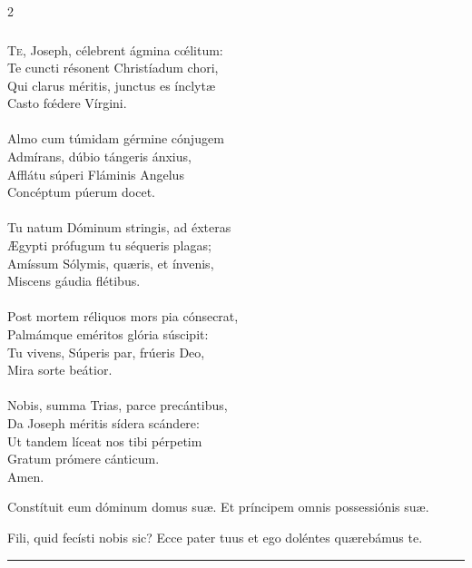 \documentclass[9pt,twoside]{extarticle}
\begin{document}
\begin{multicols}{2}
\subsubsection*{\center {}}
\lettrine{T}e, Joseph, célebrent ágmina cœ́litum:\\
Te cuncti résonent Christíadum chori,\\
Qui clarus méritis, junctus es ínclytæ\\
Casto fœ́dere Vírgini.\\
\\
Almo cum túmidam gérmine cónjugem\\
Admírans, dúbio tángeris ánxius,\\
Afflátu súperi Fláminis Angelus\\
Concéptum púerum docet.\\
\\
Tu natum Dóminum stringis, ad éxteras\\
Ægypti prófugum tu séqueris plagas;\\
Amíssum Sólymis, quæris, et ínvenis,\\
Miscens gáudia flétibus.\\
\\
Post mortem réliquos mors pia cónsecrat,\\
Palmámque eméritos glória súscipit:\\
Tu vivens, Súperis par, frúeris Deo,\\
Mira sorte beátior.\\
\\
Nobis, summa Trias, parce precántibus,\\
Da Joseph méritis sídera scándere:\\
Ut tandem líceat nos tibi pérpetim\\
Gratum prómere cánticum.\\
Amen.

\begin{tightlist}{}
\item {} Constítuit eum dóminum domus suæ.  Et príncipem omnis possessiónis suæ.
\item {} Fili, quid fecísti nobis sic? Ecce pater tuus et ego doléntes quærebámus te.
\end{tightlist}

\begin{center}\textcolor{red}{\rule{\linewidth}{0.5pt}} \end{center}

\subsection*{\center {}}

\end{multicols}
\end{document}
